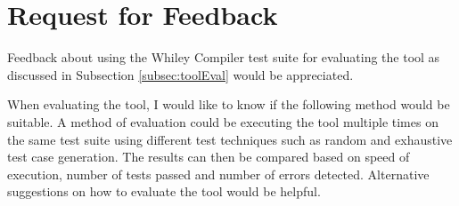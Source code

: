 \section{Request for Feedback}\label{section:feedback}


Feedback about using the Whiley Compiler test suite for evaluating the tool as discussed in Subsection \ref{subsec:toolEval} would be appreciated. 

When evaluating the tool, I would like to know if the following method would be suitable. A method of evaluation could be executing the tool multiple times on the same test suite using different test techniques such as random and exhaustive test case generation. The results can then be compared based on speed of execution, number of tests passed and number of errors detected. 
Alternative suggestions on how to evaluate the tool would be helpful.